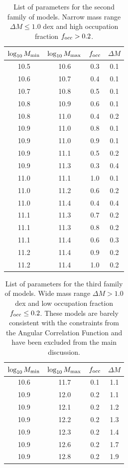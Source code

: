 \documentclass{emulateapj}
\begin{document}
\begin{table}
\begin{center}
\begin{tabular}{cccc}\hline\hline
$\log_{10}M_{\rm min}$ & $\log_{10}M_{\rm max}$ & $f_{\rm occ}$ & $\Delta M$\\\hline
 10.5 &10.6 & 0.3 & 0.1 \\
 10.6 &10.7 & 0.4 & 0.1 \\
 10.7 &10.8 & 0.5 & 0.1 \\
 10.8 &10.9 & 0.6 & 0.1 \\
 10.8 &11.0 & 0.4 & 0.2 \\
 10.9 &11.0 & 0.8 & 0.1 \\
 10.9 &11.0 & 0.9 & 0.1 \\
 10.9 &11.1 & 0.5 & 0.2 \\
 10.9 &11.3 & 0.3 & 0.4 \\
 11.0 &11.1 & 1.0 & 0.1 \\
 11.0 &11.2 & 0.6 & 0.2 \\
 11.0 &11.4 & 0.4 & 0.4 \\
 11.1 &11.3 & 0.7 & 0.2 \\
 11.1 &11.3 & 0.8 & 0.2 \\
 11.1 &11.4 & 0.6 & 0.3 \\
 11.2 &11.4 & 0.9 & 0.2 \\
 11.2 &11.4 & 1.0 & 0.2 \\\hline
\end{tabular}
\end{center}
\caption{\label{table:secondfamily}List of parameters for the second
  family of models. Narrow mass range $\Delta M\leq 1.0 $ dex and high occupation fraction $f_{\rm occ}>0.2$.}
\end{table}


\begin{table}
\begin{center}
\begin{tabular}{cccc}\hline\hline
$\log_{10}M_{\rm min}$ & $\log_{10}M_{\rm max}$ & $f_{\rm occ}$ & $\Delta M$\\\hline
 10.6 &11.7 & 0.1& 1.1 \\
 10.9 &12.0 & 0.2& 1.1 \\
 10.9 &12.1 & 0.2& 1.2 \\
 10.9 &12.2 & 0.2& 1.3 \\
 10.9 &12.3 & 0.2& 1.4 \\
 10.9 &12.6 & 0.2& 1.7 \\
 10.9 &12.8 & 0.2& 1.9 \\\hline
\end{tabular}
\end{center}
\caption{\label{table:thirdfamily}List of parameters for the third
  family of models. Wide mass range $\Delta M> 1.0$ dex and low
  occupation fraction $f_{\rm occ}\leq 0.2$. These models are barely
  consistent with the constraints from the Angular Correlation
  Function and have been excluded from the main discussion.}
\end{table}
\end{document}
